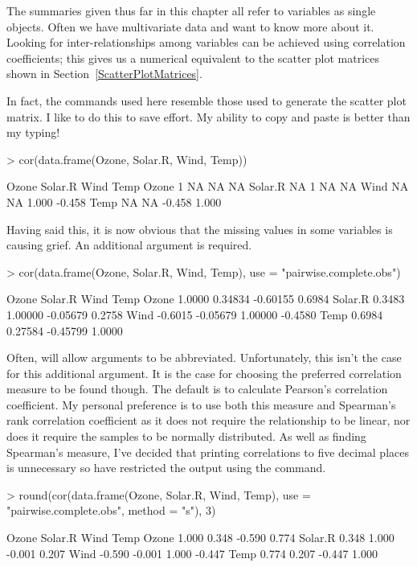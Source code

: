 The summaries given thus far in this chapter all refer to variables as single objects. Often we have multivariate data and want to know more about it. Looking for inter-relationships among variables can be achieved using correlation coefficients; this gives us a numerical equivalent to the scatter plot matrices shown in Section~\ref{ScatterPlotMatrices}.

In fact, the commands used here resemble those used to generate the scatter plot matrix. I like to do this to save effort. My ability to copy and paste is better than my typing!
\begin{Schunk}
\begin{Sinput}
> cor(data.frame(Ozone, Solar.R, Wind, Temp))
\end{Sinput}
\begin{Soutput}
        Ozone Solar.R   Wind   Temp
Ozone       1      NA     NA     NA
Solar.R    NA       1     NA     NA
Wind       NA      NA  1.000 -0.458
Temp       NA      NA -0.458  1.000
\end{Soutput}
\end{Schunk}
Having said this, it is now obvious that the missing values in some variables is causing grief. An additional argument is required.
\begin{Schunk}
\begin{Sinput}
> cor(data.frame(Ozone, Solar.R, Wind, Temp), 
   use = "pairwise.complete.obs")
\end{Sinput}
\begin{Soutput}
          Ozone  Solar.R     Wind    Temp
Ozone    1.0000  0.34834 -0.60155  0.6984
Solar.R  0.3483  1.00000 -0.05679  0.2758
Wind    -0.6015 -0.05679  1.00000 -0.4580
Temp     0.6984  0.27584 -0.45799  1.0000
\end{Soutput}
\end{Schunk}
Often, \R{} will allow arguments to be abbreviated. Unfortunately, this isn't the case for this additional argument. It is the case for choosing the preferred correlation measure to be found though. The default is to calculate Pearson's correlation coefficient. My personal preference is to use both this measure and Spearman's rank correlation coefficient as it does not require the relationship to be linear, nor does it require the samples to be normally distributed. As well as finding Spearman's measure, I've decided that printing correlations to five decimal places is unnecessary so have restricted the output using the  command.
\begin{Schunk}
\begin{Sinput}
> round(cor(data.frame(Ozone, Solar.R, Wind, Temp), 
   use = "pairwise.complete.obs", method = "s"), 3)
\end{Sinput}
\begin{Soutput}
         Ozone Solar.R   Wind   Temp
Ozone    1.000   0.348 -0.590  0.774
Solar.R  0.348   1.000 -0.001  0.207
Wind    -0.590  -0.001  1.000 -0.447
Temp     0.774   0.207 -0.447  1.000
\end{Soutput}
\end{Schunk}




